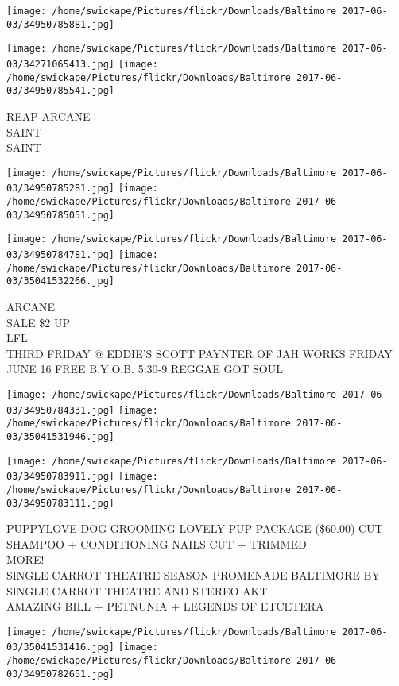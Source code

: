 \documentclass[10pt,letterpaper]{article}
\begin{document}
\texttt{[image: /home/swickape/Pictures/flickr/Downloads/Baltimore 2017-06-03/34950785881.jpg]}

\vspace{0.25in}
\texttt{[image: /home/swickape/Pictures/flickr/Downloads/Baltimore 2017-06-03/34271065413.jpg]}
\texttt{[image: /home/swickape/Pictures/flickr/Downloads/Baltimore 2017-06-03/34950785541.jpg]}

REAP ARCANE\\
SAINT\\
SAINT\\
\pagebreak

\texttt{[image: /home/swickape/Pictures/flickr/Downloads/Baltimore 2017-06-03/34950785281.jpg]}
\texttt{[image: /home/swickape/Pictures/flickr/Downloads/Baltimore 2017-06-03/34950785051.jpg]}

\texttt{[image: /home/swickape/Pictures/flickr/Downloads/Baltimore 2017-06-03/34950784781.jpg]}
\texttt{[image: /home/swickape/Pictures/flickr/Downloads/Baltimore 2017-06-03/35041532266.jpg]}

ARCANE\\
SALE \$2 UP\\
LFL\\
THIRD FRIDAY @ EDDIE'S SCOTT PAYNTER OF JAH WORKS FRIDAY JUNE 16 FREE B.Y.O.B. 5:30{-}9 REGGAE GOT SOUL\\
\pagebreak

\texttt{[image: /home/swickape/Pictures/flickr/Downloads/Baltimore 2017-06-03/34950784331.jpg]}
\texttt{[image: /home/swickape/Pictures/flickr/Downloads/Baltimore 2017-06-03/35041531946.jpg]}

\texttt{[image: /home/swickape/Pictures/flickr/Downloads/Baltimore 2017-06-03/34950783911.jpg]}
\texttt{[image: /home/swickape/Pictures/flickr/Downloads/Baltimore 2017-06-03/34950783111.jpg]}

PUPPYLOVE DOG GROOMING LOVELY PUP PACKAGE (\$60.00) CUT SHAMPOO + CONDITIONING NAILS CUT + TRIMMED\\
MORE!\\
SINGLE CARROT THEATRE SEASON PROMENADE BALTIMORE BY SINGLE CARROT THEATRE AND STEREO AKT\\
AMAZING BILL + PETNUNIA + LEGENDS OF ETCETERA\\
\pagebreak

\texttt{[image: /home/swickape/Pictures/flickr/Downloads/Baltimore 2017-06-03/35041531416.jpg]}
\texttt{[image: /home/swickape/Pictures/flickr/Downloads/Baltimore 2017-06-03/34950782651.jpg]}
\end{document}
